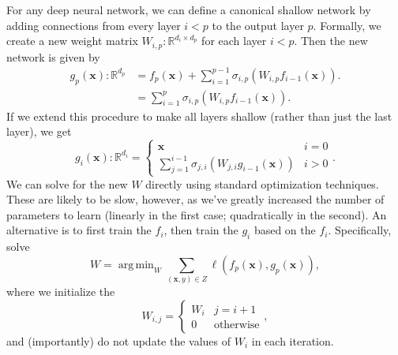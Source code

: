 \documentclass{article}
\DeclareMathOperator*{\argmin}{arg\,min}
\newcommand{\R}{\mathbb{R}}
\newcommand{\Z}{Z}
\newcommand{\w}{W}
\newcommand{\x}{\mathbf{x}}
\newcommand{\loss}{\ell}
\begin{document}
For any deep neural network, we can define a canonical shallow network by adding connections from every layer $i<p$ to the output layer $p$.
Formally, we create a new weight matrix $\w_{i,p} : \R^{d_i\times d_p}$ for each layer $i<p$.
Then the new network is given by
\begin{align}
    g_p(\x) : \R^{d_p} &= 
    f_p(\x)
    +
    \sum_{i=1}^{p-1}
    \sigma_{i,p}(\w_{i,p} f_{i-1}(\x))
    .
    \\&=
    \sum_{i=1}^{p}
    \sigma_{i,p}(\w_{i,p} f_{i-1}(\x))
    .
\end{align}
If we extend this procedure to make all layers shallow (rather than just the last layer), we get
\begin{equation}
    g_i(\x) : \R^{d_i} = 
    \begin{cases}
        \x & i=0 \\
        \displaystyle
        \sum_{j=1}^{i-1}\sigma_{j,i}(\w_{j,i} g_{i-1}(\x)) & i>0 
    \end{cases}
    .
\end{equation}
We can solve for the new $\w$ directly using standard optimization techniques.
These are likely to be slow, however, as we've greatly increased the number of parameters to learn
(linearly in the first case; quadratically in the second).
An alternative is to first train the $f_i$, then train the $g_i$ based on the $f_i$.
Specifically, solve
\begin{equation}
    \w = \argmin_\w \sum_{(\x,y)\in\Z} \loss(f_p(\x),g_p(\x)),
\end{equation}
where we initialize the 
\begin{equation}
    \w_{i,j} =
    \begin{cases}
        \w_i & j=i+1 \\
        0 & \text{otherwise}
    \end{cases}
    ,
\end{equation}
and (importantly) do not update the values of $\w_i$ in each iteration.   


\clearpage



\end{document}
